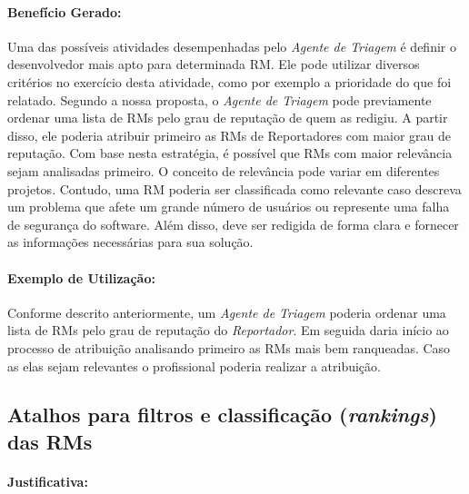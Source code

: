 \paragraph{Benefício Gerado:}
\label{par:papéis_afetados_s03}

Uma das possíveis atividades desempenhadas pelo \textit{Agente de Triagem} é
definir o desenvolvedor mais apto para determinada RM\@. Ele pode utilizar
diversos critérios no exercício desta atividade, como por exemplo a prioridade
do que foi relatado. Segundo a nossa proposta, o \textit{Agente de Triagem} pode
previamente ordenar uma lista de RMs pelo grau de reputação de quem as redigiu.
A partir disso, ele poderia atribuir primeiro as RMs de Reportadores com maior
grau de reputação. Com base nesta estratégia, é possível que RMs com maior
relevância sejam analisadas primeiro. O conceito de relevância pode variar em
diferentes projetos. Contudo, uma RM poderia ser classificada como relevante
caso descreva um problema que afete um grande número de usuários ou represente
uma falha de segurança do software. Além disso, deve ser redigida de forma clara
e fornecer as informações necessárias para sua solução.

\paragraph{Exemplo de Utilização:}
\label{par:exemplo_de_utilização_s03}

Conforme descrito anteriormente, um \textit{Agente de Triagem} poderia ordenar
uma lista de RMs pelo grau de reputação do \textit{Reportador}. Em seguida daria
início ao processo de atribuição analisando primeiro as RMs mais bem ranqueadas.
Caso as elas sejam relevantes o profissional poderia realizar a atribuição.

\subsection{Atalhos para filtros e classificação (\textit{rankings}) das RMs}
\label{sub:histórico_das_ùltimas_rm_s}


\paragraph{Justificativa:}
\label{par:justificativa_s04}

